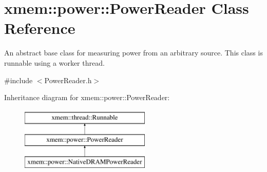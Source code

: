 \hypertarget{classxmem_1_1power_1_1_power_reader}{}\section{xmem\+:\+:power\+:\+:Power\+Reader Class Reference}
\label{classxmem_1_1power_1_1_power_reader}


An abstract base class for measuring power from an arbitrary source. This class is runnable using a worker thread.  




{\ttfamily \#include $<$Power\+Reader.\+h$>$}

Inheritance diagram for xmem\+:\+:power\+:\+:Power\+Reader\+:\begin{figure}[H]
\begin{center}
\leavevmode
\includegraphics[height=3.000000cm]{classxmem_1_1power_1_1_power_reader}
\end{center}
\end{figure}
